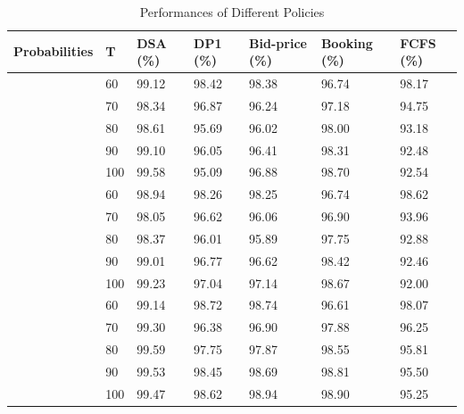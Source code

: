 

\begin{table}[ht]
  \centering
  \caption{Performances of Different Policies}
  \begin{tabular}{|l|l|l|l|l|l|l|}
  \hline
  Probabilities &  T &  DSA (\%) & DP1 (\%) & Bid-price (\%) & Booking (\%) & FCFS (\%) \\
  \hline
  [0.25,0.25,0.25,0.25] & 60  &  99.12 & 98.42 & 98.38 & 96.74 & 98.17 \\
  & 70                             & 98.34 & 96.87 & 96.24 & 97.18 & 94.75 \\
  & 80                             & 98.61 & 95.69 & 96.02 & 98.00 & 93.18 \\
  & 90                             & 99.10 & 96.05 & 96.41 & 98.31 & 92.48 \\
  & 100                            & 99.58 & 95.09 & 96.88 & 98.70 & 92.54 \\
   \hline
  [0.45, 0.05, 0.05, 0.45] & 60  &  98.94 & 98.26 & 98.25 & 96.74 & 98.62 \\
  & 70                             & 98.05 & 96.62 & 96.06 & 96.90 & 93.96 \\
  & 80                            & 98.37 & 96.01 & 95.89 & 97.75 & 92.88 \\
  & 90                            & 99.01 & 96.77 & 96.62 & 98.42 & 92.46 \\
  & 100                            & 99.23 & 97.04 & 97.14 & 98.67 & 92.00 \\
  \hline
  [0.25, 0.05, 0.65, 0.05] & 60  &  99.14 & 98.72 & 98.74 & 96.61 & 98.07 \\
  & 70                             & 99.30 & 96.38 & 96.90 & 97.88 & 96.25 \\
  & 80                             & 99.59 & 97.75 & 97.87 & 98.55 & 95.81 \\
  & 90                             & 99.53 & 98.45 & 98.69 & 98.81 & 95.50 \\
  & 100                            & 99.47 & 98.62 & 98.94 & 98.90 & 95.25 \\
  \hline
  \end{tabular}
\end{table}

